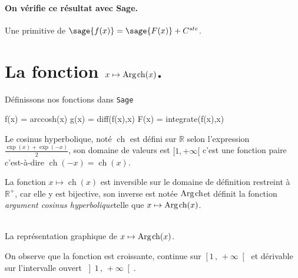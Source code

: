 \documentclass[a4paper,12pt]{report}
\def\eclaire{\mathbb}
\def\R{\ensuremath{\eclaire R}}
\renewcommand{\cosh}{\mathop{\mathrm{ch}}}
\renewcommand{\arg}{\mathop{\mathrm{Arg}}}
\begin{document}
\paragraph{On vérifie ce résultat avec Sage.}
Une primitive de $\sage{f(x)} = \sage{F(x)} + C^{ste}$.





\section{La fonction  $x \mapsto \arg\mspace{-1mu}\cosh(x)$.}
Définissons nos fonctions dans {\texttt{Sage}}
\begin{sageblock}
    f(x) = arccosh(x)
    g(x) = diff(f(x),x)
    F(x) = integrate(f(x),x)
\end{sageblock}

Le cosinus hyperbolique, noté $\cosh$ est défini sur $\R$ selon l'expression $\frac{\exp(x)+\exp(-x)}{2}$, son domaine de valeurs est $[1, +\infty [$ 
c'est une fonction paire c'est-à-dire $\cosh(-x)=\cosh(x)$.


La fonction $x \mapsto \cosh(x)$ est inversible sur le domaine de définition restreint à $\R^+$, car elle y est bijective, son inverse est notée \og $ \arg\mspace{-1mu}\cosh $\fg et définit la fonction \og\emph{argument cosinus hyperbolique}\fg telle que $x \mapsto \arg\mspace{-1mu}\cosh(x)$.
\begin{center}
 \\
La représentation graphique de $x \mapsto \arg\mspace{-1mu}\cosh(x)$.
\end{center}
On observe que la fonction est croissante, continue sur $\left[1\,,\,+\infty \right[ $ et dérivable sur l'intervalle ouvert $\left]1\,,\,+\infty \right[ $.
                                                                                               
\end{document}
